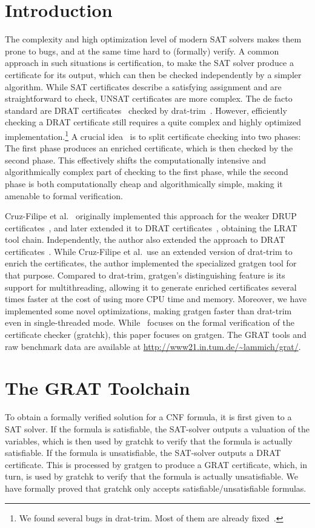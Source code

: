 \documentclass{llncs}
\begin{document}
\section{Introduction}
The complexity and high optimization level of modern SAT solvers makes them prone to bugs, and at the same time hard to (formally) verify.
A common approach in such situations is certification, \ie to make the SAT solver produce a certificate for its output, which can then be checked 
independently by a simpler algorithm. While SAT certificates describe a satisfying assignment and are straightforward to check, UNSAT certificates are 
more complex. The de facto standard are DRAT certificates~\cite{WHH14} checked by drat-trim~\cite{drat-trim-webpage}. 
However, efficiently checking a DRAT certificate still requires a quite complex and highly optimized implementation.\footnote{We found several bugs in drat-trim. Most of them are already fixed~\cite{drat-trim-issues,La17_CADE}.} 
A crucial idea~\cite{CMS17} is to split certificate checking into two phases: The first phase produces an enriched certificate, which is then checked by the second phase.
This effectively shifts the computationally intensive and algorithmically complex part of checking to the first phase, while the second phase is both computationally cheap 
and algorithmically simple, making it amenable to formal verification. 

Cruz-Filipe et al.~\cite{CMS17} originally implemented this approach for the weaker DRUP certificates~\cite{WHH13},
and later extended it to DRAT certificates~\cite{CHHKS17,HHKW17}, obtaining the LRAT tool chain. 
Independently, the author also extended the approach to DRAT certificates~\cite{La17_CADE}.
While Cruz-Filipe et al.\ use an extended version of drat-trim to enrich the certificates, the author implemented the specialized gratgen tool for that purpose.
Compared to drat-trim, gratgen's distinguishing feature is its support for multithreading, allowing it to generate enriched certificates several times faster
at the cost of using more CPU time and memory. Moreover, we have implemented some novel optimizations, making gratgen faster than drat-trim even in single-threaded mode.
While~\cite{La17_CADE} focuses on the formal verification of the certificate checker (gratchk), this paper focuses on gratgen. 
The GRAT tools and raw benchmark data are available at \url{http://www21.in.tum.de/~lammich/grat/}.

\section{The GRAT Toolchain}
To obtain a formally verified solution for a CNF formula, it is first given to a SAT solver.
If the formula is satisfiable, the SAT-solver outputs a valuation of the variables, 
which is then used by gratchk to verify that the formula is actually satisfiable.
If the formula is unsatisfiable, the SAT-solver outputs a DRAT certificate.
This is processed by gratgen to produce a GRAT certificate, which, in turn, is used by 
gratchk to verify that the formula is actually unsatisfiable. We have formally proved that
gratchk only accepts satisfiable/unsatisfiable formulas.
\end{document}
